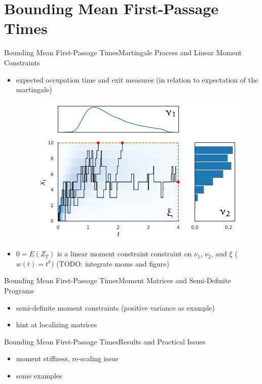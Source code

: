 \documentclass{beamer}
\newcommand{\expSym}{{E}}
\newcommand{\E}[1]{\ensuremath{\expSym\left(#1\right)}}
\begin{document}
\section{Bounding Mean First-Passage Times}
\begin{frame}{Bounding Mean First-Passage Times}{Martingale Process and Linear Moment Constraints}
  \begin{itemize}
      \item expected occupation time and exit measures (in relation to expectation of the martingale)
    \begin{figure}
        \centering
        \includegraphics[scale=.4]{../gfx/decomp1.pdf}
    \end{figure}
    \item $0=\E{ Z_T }$ is a linear moment constraint constraint on $\nu_1$, $\nu_2$, and $\xi$ ($w(t)=t^k$) (TODO: integrate moms and figure)
  \end{itemize}
\end{frame}

\begin{frame}{Bounding Mean First-Passage Times}{Moment Matrices and Semi-Definite Programs}
  \begin{itemize}
    \item semi-definite moment constraints (positive variance as example)
    \item hint at localizing matrices
  \end{itemize}
\end{frame}

\begin{frame}{Bounding Mean First-Passage Times}{Results and Practical Issues}
  \begin{itemize}
    \item moment stiffness, re-scaling issue
    \item some examples
  \end{itemize}
\end{frame}
\end{document}

